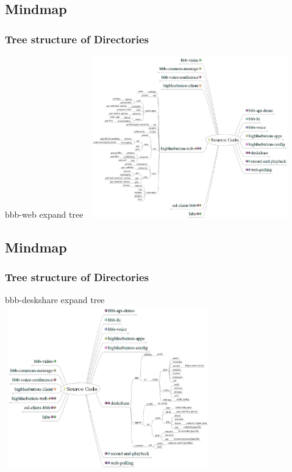 \documentclass{beamer}
\begin{document}
\subsection*{Mindmap}
\begin{frame}
\frametitle{Tree structure of Directories}
{bbb-web expand tree}
\includegraphics[height=70mm,width=90mm]{./images/SourceCode10.jpeg}
\end{frame}


\subsection*{Mindmap}
\begin{frame}
\frametitle{Tree structure of Directories}
{bbb-deskshare expand tree}
\includegraphics[height=70mm,width=90mm]{./images/SourceCode11.jpeg}
\end{frame}
\end{document}
